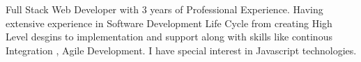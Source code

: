 Full Stack Web Developer with 3 years of Professional Experience. Having extensive experience in Software Development Life Cycle from creating High Level desgins to implementation and support along with skills like continous Integration , Agile Development.  I have special interest in Javascript technologies.